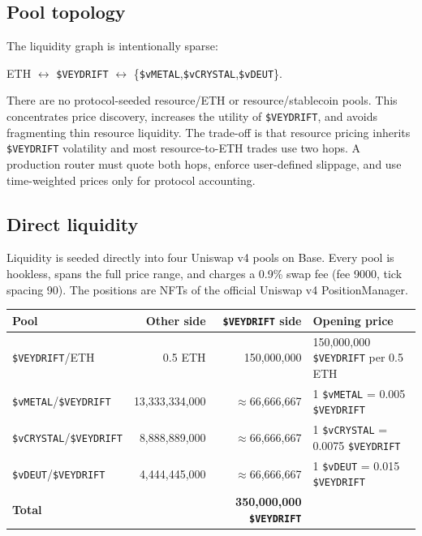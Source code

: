 \documentclass[11pt]{article}
\newcommand{\token}[1]{\texttt{\$#1}}
\begin{document}
\subsection{Pool topology}

The liquidity graph is intentionally sparse:

\begin{center}
ETH $\longleftrightarrow$ \token{VEYDRIFT} $\longleftrightarrow$
\{\token{vMETAL},\token{vCRYSTAL},\token{vDEUT}\}.
\end{center}

There are no protocol-seeded resource/ETH or resource/stablecoin pools. This concentrates price discovery, increases the utility of \token{VEYDRIFT}, and avoids fragmenting thin resource liquidity. The trade-off is that resource pricing inherits \token{VEYDRIFT} volatility and most resource-to-ETH trades use two hops. A production router must quote both hops, enforce user-defined slippage, and use time-weighted prices only for protocol accounting.

\subsection{Direct liquidity}

Liquidity is seeded directly into four Uniswap v4 pools on Base. Every pool is hookless, spans the full price range, and charges a 0.9\% swap fee (fee 9000, tick spacing 90). The positions are NFTs of the official Uniswap v4 PositionManager.

\begin{table}[h]
\centering
\scriptsize
\begin{tabular}{@{}l r r l@{}}
\toprule
\textbf{Pool} & \textbf{Other side} & \textbf{\token{VEYDRIFT} side} & \textbf{Opening price} \\
\midrule
\token{VEYDRIFT}/ETH & 0.5 ETH & 150,000,000 & 150,000,000 \token{VEYDRIFT} per 0.5 ETH \\
\token{vMETAL}/\token{VEYDRIFT} & 13,333,334,000 & $\approx$66,666,667 & 1 \token{vMETAL} = 0.005 \token{VEYDRIFT} \\
\token{vCRYSTAL}/\token{VEYDRIFT} & 8,888,889,000 & $\approx$66,666,667 & 1 \token{vCRYSTAL} = 0.0075 \token{VEYDRIFT} \\
\token{vDEUT}/\token{VEYDRIFT} & 4,444,445,000 & $\approx$66,666,667 & 1 \token{vDEUT} = 0.015 \token{VEYDRIFT} \\
\midrule
\textbf{Total} & & \textbf{350,000,000 \token{VEYDRIFT}} & \\
\bottomrule
\end{tabular}
\end{table}
\end{document}

